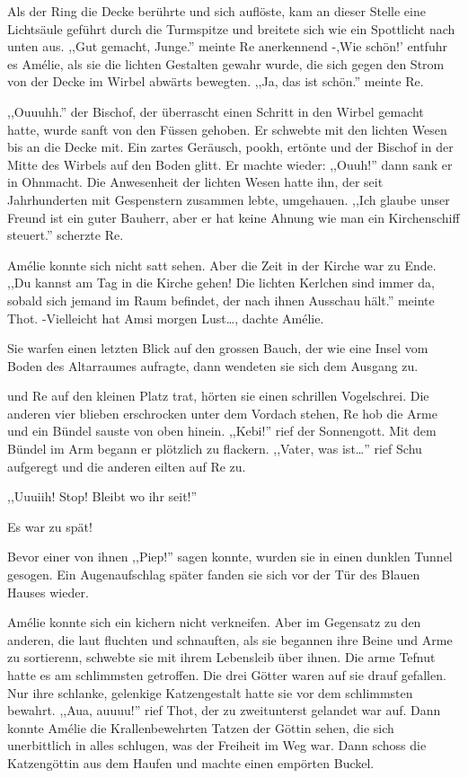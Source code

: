 \documentclass[11pt,titlepage,a5paper]{book}
\begin{document}
Als der Ring die Decke berührte und sich auflöste, kam an dieser Stelle eine Lichtsäule geführt durch die Turmspitze und breitete sich wie ein Spottlicht nach unten aus. ,,Gut gemacht, Junge.'' meinte Re anerkennend -,Wie schön!' entfuhr es Amélie, als sie die lichten Gestalten gewahr wurde, die sich gegen den Strom von der Decke im Wirbel abwärts bewegten. ,,Ja, das ist schön.'' meinte Re.

,,Ouuuhh.'' der Bischof, der überrascht einen Schritt in den Wirbel gemacht hatte, wurde sanft von den Füssen gehoben. Er schwebte mit den lichten Wesen bis an die Decke mit. Ein zartes Geräusch, pookh,  ertönte und der Bischof in der Mitte des Wirbels auf den Boden glitt. Er machte wieder: ,,Ouuh!'' dann sank er in Ohnmacht. Die Anwesenheit der lichten Wesen hatte ihn, der seit Jahrhunderten mit Gespenstern zusammen lebte, umgehauen. ,,Ich glaube unser Freund ist ein guter Bauherr, aber er hat keine Ahnung wie man ein Kirchenschiff steuert.'' scherzte Re.

Amélie konnte sich nicht satt sehen. Aber die Zeit in der Kirche war zu Ende. ,,Du kannst am Tag in die Kirche gehen! Die lichten Kerlchen sind immer da, sobald sich jemand im Raum befindet, der nach ihnen Ausschau hält.'' meinte Thot. -Vielleicht hat Amsi morgen Lust\dots, dachte Amélie.

Sie warfen einen letzten Blick auf den grossen Bauch, der wie eine Insel vom Boden des Altarraumes aufragte, dann wendeten sie sich dem Ausgang zu.

und Re auf den kleinen Platz trat, hörten sie einen schrillen Vogelschrei. Die anderen vier blieben erschrocken unter dem Vordach stehen, Re hob die Arme und ein Bündel sauste von oben hinein. ,,Kebi!'' rief der Sonnengott. Mit dem Bündel im Arm begann er plötzlich zu flackern. ,,Vater, was ist\dots'' rief Schu aufgeregt und die anderen eilten auf Re zu.
\begin{Large},,Uuuiih! Stop! Bleibt wo ihr seit!''\end{Large} Es war zu spät!

Bevor einer von ihnen ,,Piep!'' sagen konnte, wurden sie in einen dunklen Tunnel gesogen. Ein Augenaufschlag später fanden sie sich vor der Tür des Blauen Hauses wieder.

Amélie konnte sich ein kichern nicht verkneifen. Aber im Gegensatz zu den anderen, die laut fluchten und schnauften,  als sie begannen ihre Beine und Arme zu sortierenn, schwebte sie mit ihrem Lebensleib über ihnen. Die arme Tefnut hatte es am schlimmsten getroffen. Die drei Götter waren auf sie drauf gefallen. Nur ihre schlanke, gelenkige Katzengestalt hatte sie vor dem schlimmsten bewahrt. ,,Aua, auuuu!'' rief Thot, der zu zweitunterst gelandet war auf. Dann konnte Amélie die Krallenbewehrten Tatzen der Göttin sehen, die sich unerbittlich in alles schlugen, was der Freiheit im Weg war. Dann schoss die Katzengöttin aus dem Haufen und machte einen empörten Buckel.

\tableofcontents


{}

\end{document}
